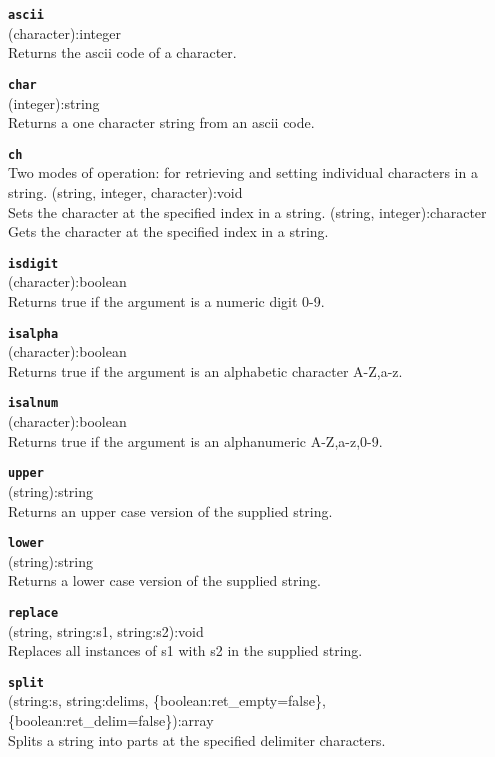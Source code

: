 \documentclass{article}
\begin{document}
{\large \texttt{\textbf{ascii}}}\\
\textsf{ (character):integer }\\
Returns the ascii code of a character.

{\large \texttt{\textbf{char}}}\\
\textsf{ (integer):string }\\
Returns a one character string from an ascii code.

{\large \texttt{\textbf{ch}}}\\
Two modes of operation: for retrieving and setting individual characters in a string.
\textsf{ (string, integer, character):void }\\
Sets the character at the specified index in a string.
\textsf{ (string, integer):character }\\
Gets the character at the specified index in a string.

{\large \texttt{\textbf{isdigit}}}\\
\textsf{ (character):boolean }\\
Returns true if the argument is a numeric digit 0-9.

{\large \texttt{\textbf{isalpha}}}\\
\textsf{ (character):boolean }\\
Returns true if the argument is an alphabetic character A-Z,a-z.

{\large \texttt{\textbf{isalnum}}}\\
\textsf{ (character):boolean }\\
Returns true if the argument is an alphanumeric A-Z,a-z,0-9.

{\large \texttt{\textbf{upper}}}\\
\textsf{ (string):string }\\
Returns an upper case version of the supplied string.

{\large \texttt{\textbf{lower}}}\\
\textsf{ (string):string }\\
Returns a lower case version of the supplied string.

{\large \texttt{\textbf{replace}}}\\
\textsf{ (string, string:s1, string:s2):void }\\
Replaces all instances of s1 with s2 in the supplied string.

{\large \texttt{\textbf{split}}}\\
\textsf{ (string:s, string:delims, \{boolean:ret\_empty=false\}, \{boolean:ret\_delim=false\}):array }\\
Splits a string into parts at the specified delimiter characters.
\end{document}
